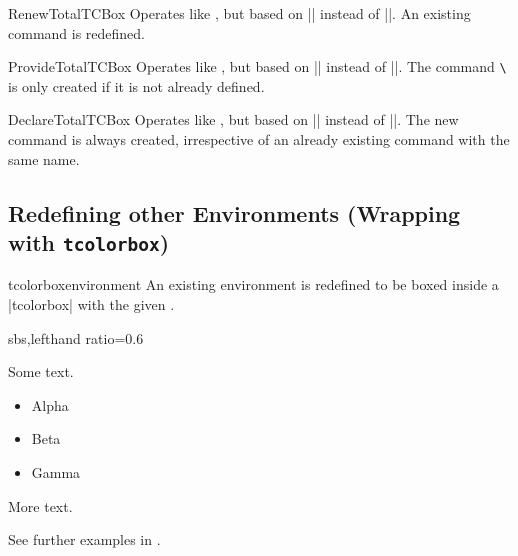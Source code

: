 \clearpage

\begin{docCommand}{RenewTotalTCBox}{}
  Operates like , but based on |\RenewDocumentCommand| instead of |\NewDocumentCommand|.
  An existing command is redefined.
\end{docCommand}

\begin{docCommand}{ProvideTotalTCBox}{}
  Operates like , but based on |\ProvideDocumentCommand| instead of |\NewDocumentCommand|.
  The command \texttt{\textbackslash} is only created if it is not already defined.
\end{docCommand}

\begin{docCommand}{DeclareTotalTCBox}{}
  Operates like , but based on |\DeclareDocumentCommand| instead of |\NewDocumentCommand|.
  The new command is always created, irrespective of an already existing
  command with the same name.
\end{docCommand}



\subsection{Redefining other Environments (Wrapping with \texttt{tcolorbox})}\label{subsec:macros_refine}

\begin{docCommand}[doc new=2014-10-20]{tcolorboxenvironment}{}
  An existing environment  is redefined to be boxed inside a
  |tcolorbox| with the given .
\begin{dispExample*}{sbs,lefthand ratio=0.6}
\newenvironment{myitemize}{%
  \begin{itemize}}{\end{itemize}}


Some text.
\begin{myitemize}
\item Alpha
\item Beta
\item Gamma
\end{myitemize}
More text.
\end{dispExample*}

\medskip
See further examples in .
\end{docCommand}

